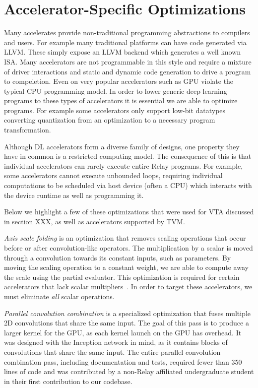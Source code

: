 \section{Accelerator-Specific Optimizations}
\label{sec:accel-opts}

Many accelerates provide non-traditional programming
    abstractions to compilers and users.
For example many traditional platforms can have
    code generated via LLVM.
These simply expose an LLVM backend which generates
    a well known ISA.
Many accelerators are not programmable in this style
    and require a mixture of driver interactions
    and static and dynamic code generation to
    drive a program to compeletion.
Even on very popular accelerators such as GPU
    violate the typical CPU programming model.
In order to lower generic deep learning programs
    to these types of accelerators it is
    essential we are able to optimize programs.
For example some accelerators only support
    low-bit datatypes converting quantization
    from an optimization to a necessary program
    transformation.

Although DL accelerators form a diverse family of designs,
  one property they have in common is a restricted computing model.
The consequence of this is that individual accelerators
  can rarely execute entire Relay programs.
For example, some accelerators cannot execute unbounded loops,
  requiring individual computations to be scheduled via
  host device (often a CPU) which interacts with the device runtime
  as well as programming it.

Below we highlight a few of these optimizations that were used for
VTA discussed in section XXX, as well as accelerators supported by
TVM.

\textit{Axis scale folding} is an optimization that removes scaling
  operations that occur before or after convolution-like operators.
The multiplication by a scalar is moved through a convolution towards
  its constant inputs, such as parameters.
By moving the scaling operation to a constant weight, we are able
  to compute away the scale using the partial evaluator.
This optimization is required for certain accelerators that lack scalar multipliers~\citep{moreau2018vta}.
In order to target these accelerators,
  we must eliminate \textit{all} scalar operations.

\textit{Parallel convolution combination} is a specialized
  optimization that fuses multiple 2D convolutions that share the same input.
The goal of this pass is to produce a larger kernel for the GPU,
  as each kernel launch on the GPU has overhead.
It was designed with the Inception network \citep{inception} in mind, as it
  contains blocks of convolutions that share the same input.
The entire parallel convolution combination pass,
  including documentation and tests,
  required fewer than 350 lines of code and was contributed
  by a non-Relay affiliated undergraduate student
  in their first contribution to our codebase.


